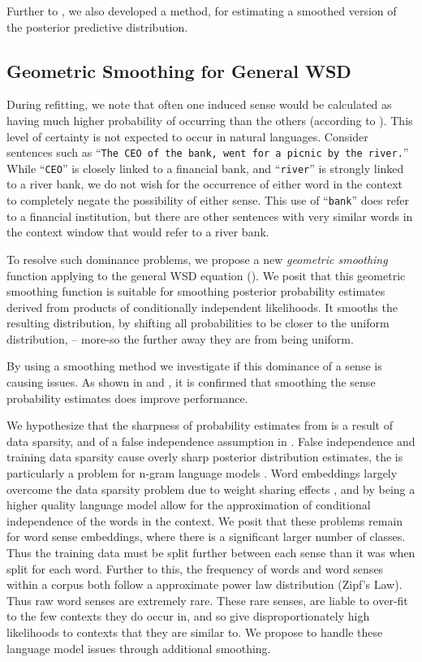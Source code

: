\documentclass{article} %
\def\parencite{\cite} %
\newcommand{\wordquote}[1]{\enquote{\texttt{#1}}}
\begin{document}
Further to , we also developed a method, for estimating a smoothed version of the posterior predictive distribution.


\subsection{Geometric Smoothing for General WSD} \label{smoothing}


During refitting, we note that often one induced sense would be calculated as having much higher probability of occurring than the others (according to ).
This level of certainty is not expected to occur in natural languages. 
Consider sentences such as \wordquote{The CEO of the bank, went for a picnic by the river.} 
While \wordquote{CEO} is closely linked to a financial bank, and \wordquote{river} is strongly linked to a river bank, we do not wish for the occurrence of either word in the context to completely negate the possibility of either sense.
This use of \wordquote{bank} does refer to a financial institution, but there are other sentences with very similar words in the context window that would refer to a river bank.

To resolve such dominance problems, we propose a new \emph{geometric smoothing} function applying to the general WSD equation ().
We posit that this geometric smoothing function is suitable for smoothing posterior probability estimates derived from products of conditionally independent likelihoods.
It smooths the resulting distribution, by shifting all probabilities to be closer to the uniform distribution,  -- more-so the further away they are from being uniform.

By using a smoothing method we investigate if this dominance of a sense is causing issues.
As shown in  and , it is confirmed that smoothing the sense probability estimates does improve performance.


We hypothesize that the sharpness of probability estimates from  is a result of data sparsity, and of a false independence assumption in . False independence and training data sparsity cause overly sharp posterior distribution estimates, the is particularly a problem for n-gram language models \cite{rosenfeld2000two}.
Word  embeddings largely overcome the data sparsity problem due to weight sharing effects \parencite{NPLM},  and by being a higher quality language model allow for the approximation of conditional independence of the words in the context.
We posit that these problems remain for word sense embeddings, where there is a significant larger number of classes.
Thus the training data must be split further between each sense than it was when split for each word. 
Further to this, the frequency of words \parencite{zipf1949human}  and word senses \parencite{Kilgarriff2004} within a corpus both follow a approximate power law distribution (Zipf's Law).
Thus raw word senses are extremely rare.
These rare senses, are liable to over-fit to the few contexts they do occur in, and so give disproportionately high likelihoods to contexts that they are similar to.
We propose to handle these language model issues through additional smoothing.
\end{document}
